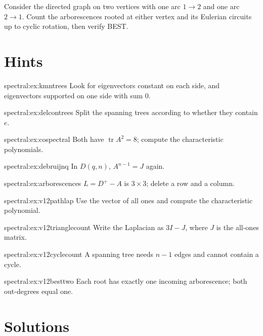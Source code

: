 \begin{exercise}[$\star\star\star$]\label{spectral:ex:v12besttwo}
Consider the directed graph on two vertices with one arc $1\to2$ and one arc $2\to1$. Count the arborescences rooted at either vertex and its Eulerian circuits up to cyclic rotation, then verify BEST.
\end{exercise}

\section{Hints}

\begin{hint}{spectral:ex:kmntrees}
Look for eigenvectors constant on each side, and eigenvectors supported on one side with sum $0$.
\end{hint}
\begin{hint}{spectral:ex:delcontrees}
Split the spanning trees according to whether they contain $e$.
\end{hint}
\begin{hint}{spectral:ex:cospectral}
Both have $\operatorname{tr}A^2=8$; compute the characteristic polynomials.
\end{hint}
\begin{hint}{spectral:ex:debruijnq}
In $D(q,n)$, $A^{n-1}=J$ again.
\end{hint}
\begin{hint}{spectral:ex:arborescences}
$L=D^+-A$ is $3\times3$; delete a row and a column.
\end{hint}

\begin{hint}{spectral:ex:v12pathlap}
Use the vector of all ones and compute the characteristic polynomial.
\end{hint}

\begin{hint}{spectral:ex:v12trianglecount}
Write the Laplacian as $3I-J$, where $J$ is the all-ones matrix.
\end{hint}

\begin{hint}{spectral:ex:v12cyclecount}
A spanning tree needs $n-1$ edges and cannot contain a cycle.
\end{hint}

\begin{hint}{spectral:ex:v12besttwo}
Each root has exactly one incoming arborescence; both out-degrees equal one.
\end{hint}

\section{Solutions}


